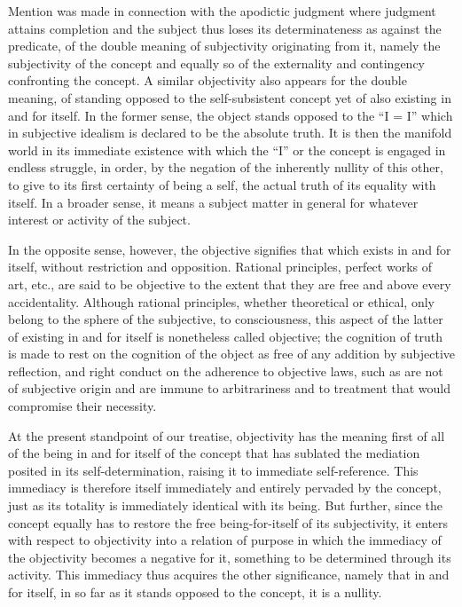 Mention was made in connection with the apodictic judgment
where judgment attains completion
and the subject thus loses its determinateness
as against the predicate,
of the double meaning of subjectivity originating from it,
namely the subjectivity of the concept
and equally so of the externality
and contingency confronting the concept.
A similar objectivity also appears for the double meaning,
of standing opposed to the self-subsistent concept
yet of also existing in and for itself.
In the former sense, the object stands opposed
to the “I = I” which in subjective idealism
is declared to be the absolute truth.
It is then the manifold world in its immediate existence
with which the “I” or the concept is engaged in endless struggle,
in order, by the negation of the inherently nullity of this other,
to give to its first certainty of being a self,
the actual truth of its equality with itself.
In a broader sense, it means a subject matter in general
for whatever interest or activity of the subject.

In the opposite sense, however,
the objective signifies that which exists in and for itself,
without restriction and opposition.
Rational principles, perfect works of art, etc.,
are said to be objective to the extent
that they are free and above every accidentality.
Although rational principles, whether theoretical or ethical,
only belong to the sphere of the subjective, to consciousness,
this aspect of the latter of existing in and for itself
is nonetheless called objective;
the cognition of truth is made to rest on
the cognition of the object as free of
any addition by subjective reflection,
and right conduct on the adherence to objective laws,
such as are not of subjective origin
and are immune to arbitrariness
and to treatment that would compromise their necessity.

At the present standpoint of our treatise,
objectivity has the meaning first of all of
the being in and for itself of the concept
that has sublated the mediation posited
in its self-determination,
raising it to immediate self-reference.
This immediacy is therefore itself
immediately and entirely pervaded by the concept,
just as its totality is immediately identical with its being.
But further, since the concept equally has to restore
the free being-for-itself of its subjectivity,
it enters with respect to objectivity
into a relation of purpose
in which the immediacy of the objectivity
becomes a negative for it,
something to be determined through its activity.
This immediacy thus acquires the other significance,
namely that in and for itself,
in so far as it stands opposed to the concept,
it is a nullity.

